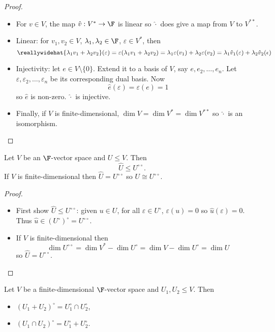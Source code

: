 \documentclass[a4paper]{article}
\newcommand*{\ann}{\circ}
\theoremstyle{definition}
\begin{document}
\begin{proof}\leavevmode
  \begin{itemize}
  \item For \(v\in V\), the map \(\hat v: V^* \to \F\) is linear so \(\hat \cdot\) does give a map from \(V\) to \(V^{**}\).
  \item Linear: for \(v_1, v_2 \in V\), \(\lambda_1, \lambda_2 \in \F\), \(\varepsilon \in V^*\), then
    \[
      \reallywidehat{\lambda_1v_1 + \lambda_2v_2}(\varepsilon) = \varepsilon(\lambda_1v_1 + \lambda_2v_2) = \lambda_1 \varepsilon(v_1) + \lambda_2 \varepsilon(v_2) = \lambda_1 \hat v_1(\varepsilon) + \lambda_2 \hat v_2(\epsilon)
    \]
  \item Injectivity: let \(e \in V\setminus\{0\}\). Extend it to a basis of \(V\), say \(e, e_2,\dots, e_n\). Let \(\varepsilon, \varepsilon_2,\dots, \varepsilon_n\) be its corresponding dual basis. Now
    \[
      \hat e(\varepsilon) = \varepsilon(e) = 1 
    \]
    so \(\hat e\) is non-zero. \(\hat \cdot\) is injective.
  \item Finally, if \(V\) is finite-dimensional, \(\dim V = \dim V^* = \dim V^{**}\) so \(\hat \cdot\) is an isomorphism.
  \end{itemize}
\end{proof}

\begin{lemma}
  Let \(V\) be an \(\F\)-vector space and \(U \leq V\). Then
  \[
    \hat U \leq U^{\ann \ann}.
  \]
  If \(V\) is finite-dimensional then \(\hat U = U^{\ann \ann}\) so \(U \cong U^{\ann \ann}\).
\end{lemma}

\begin{proof}\leavevmode
  \begin{itemize}
  \item First show \(\hat U \leq U^{\ann \ann}\): given \(u \in U\), for all \(\varepsilon \in U^\ann\), \(\varepsilon(u) = 0\) so \(\hat u(\varepsilon) = 0\). Thus \(\hat u \in (U^\ann)^\ann = U^{\ann \ann}\).
  \item If \(V\) is finite-dimensional then
    \[
      \dim U^{\ann \ann} = \dim V^* - \dim U^\ann = \dim V - \dim U^\ann = \dim U
    \] so \(\hat U = U^{\ann \ann}\).
  \end{itemize}
\end{proof}

\begin{lemma}
  Let \(V\) be a finite-dimensional \(\F\)-vector space and \(U_1, U_2 \leq V\). Then
  \begin{itemize}
  \item \((U_1 + U_2)^\ann = U_1^\ann \cap U_2^\ann\),
  \item \((U_1 \cap U_2)^\ann = U_1^\ann + U_2^\ann\).
  \end{itemize}
\end{lemma}
\end{document}
